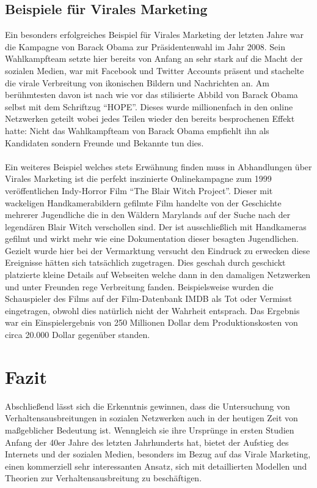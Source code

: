 \documentclass[12pt]{article}
\begin{document}
\subsection{Beispiele für Virales Marketing}
Ein besonders erfolgreiches Beispiel für Virales Marketing der letzten Jahre war die Kampagne von Barack Obama zur Präsidentenwahl im Jahr 2008. Sein Wahlkampfteam setzte hier bereits von Anfang an sehr stark auf die Macht der sozialen Medien, war mit Facebook und Twitter Accounts präsent und stachelte die virale Verbreitung von ikonischen Bildern und Nachrichten an. Am berühmtesten davon ist nach wie vor das stilisierte Abbild von Barack Obama selbst mit dem Schriftzug "`HOPE"'. Dieses wurde millionenfach in den online Netzwerken geteilt wobei jedes Teilen wieder den bereits besprochenen Effekt hatte: Nicht das Wahlkampfteam von Barack Obama empfiehlt ihn als Kandidaten sondern Freunde und Bekannte tun dies.\\\\
Ein weiteres Beispiel welches stets Erwähnung finden muss in Abhandlungen über Virales Marketing ist die perfekt inszinierte Onlinekampagne zum 1999 veröffentlichen Indy-Horror Film "`The Blair Witch Project"'. Dieser mit wackeligen Handkamerabildern gefilmte Film handelte von der Geschichte mehrerer Jugendliche die in den Wäldern Marylands auf der Suche nach der legendären Blair Witch verschollen sind. Der ist ausschließlich mit Handkameras gefilmt und wirkt mehr wie eine Dokumentation dieser besagten Jugendlichen. Gezielt wurde hier bei der Vermarktung versucht den Eindruck zu erwecken diese Ereignisse hätten sich tatsächlich zugetragen. Dies geschah durch geschickt platzierte kleine Details auf Webseiten welche dann in den damaligen Netzwerken und unter Freunden rege Verbreitung fanden. Beispielsweise wurden die Schauspieler des Films auf der Film-Datenbank IMDB als Tot oder Vermisst eingetragen, obwohl dies natürlich nicht der Wahrheit entsprach. Das Ergebnis war ein Einspielergebnis von 250 Millionen Dollar dem Produktionskosten von circa 20.000 Dollar gegenüber standen.

\section{Fazit}
Abschließend lässt sich die Erkenntnis gewinnen, dass die Untersuchung von Verhaltensausbreitungen in sozialen Netzwerken auch in der heutigen Zeit von maßgeblicher Bedeutung ist. Wenngleich sie ihre Ursprünge in ersten Studien Anfang der 40er Jahre des letzten Jahrhunderts hat, bietet der Aufstieg des Internets und der sozialen Medien, besonders im Bezug auf das Virale Marketing, einen kommerziell sehr interessanten Ansatz, sich mit detaillierten Modellen und Theorien zur Verhaltensausbreitung zu beschäftigen.
\end{document}
